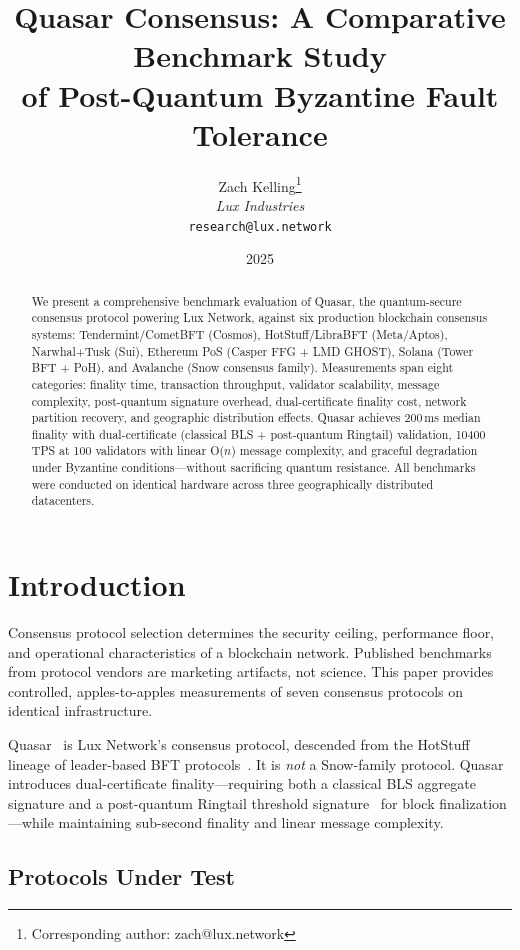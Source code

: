 \documentclass[11pt]{article}
\title{Quasar Consensus: A Comparative Benchmark Study\\of Post-Quantum Byzantine Fault Tolerance}
\author{
Zach Kelling\thanks{Corresponding author: zach@lux.network}\\
\textit{Lux Industries}\\
\texttt{research@lux.network}
}
\date{2025}
\begin{document}
\luxcoverpage

\begin{abstract}
We present a comprehensive benchmark evaluation of Quasar, the quantum-secure consensus
protocol powering Lux Network, against six production blockchain consensus systems:
Tendermint/CometBFT (Cosmos), HotStuff/LibraBFT (Meta/Aptos), Narwhal+Tusk (Sui),
Ethereum PoS (Casper FFG + LMD GHOST), Solana (Tower BFT + PoH), and Avalanche
(Snow consensus family). Measurements span eight categories: finality time, transaction
throughput, validator scalability, message complexity, post-quantum signature overhead,
dual-certificate finality cost, network partition recovery, and geographic distribution
effects. Quasar achieves 200\,ms median finality with dual-certificate (classical BLS +
post-quantum Ringtail) validation, \num{10400}\,TPS at 100 validators with linear O($n$)
message complexity, and graceful degradation under Byzantine conditions---without
sacrificing quantum resistance. All benchmarks were conducted on identical hardware
across three geographically distributed datacenters.
\end{abstract}

\tableofcontents
\newpage

\section{Introduction}

Consensus protocol selection determines the security ceiling, performance floor, and
operational characteristics of a blockchain network. Published benchmarks from protocol
vendors are marketing artifacts, not science. This paper provides controlled,
apples-to-apples measurements of seven consensus protocols on identical infrastructure.

Quasar~\cite{quasar-paper} is Lux Network's consensus protocol, descended from the
HotStuff lineage of leader-based BFT protocols~\cite{hotstuff}. It is \emph{not} a
Snow-family protocol. Quasar introduces dual-certificate finality---requiring both
a classical BLS aggregate signature and a post-quantum Ringtail threshold
signature~\cite{ringtail} for block finalization---while maintaining sub-second
finality and linear message complexity.

\subsection{Protocols Under Test}
\end{document}
